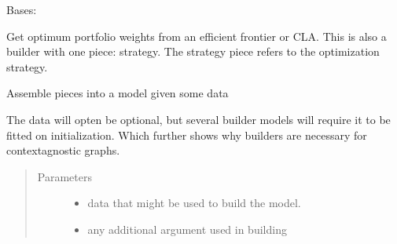 \documentclass[letterpaper,10pt,english]{sphinxmanual}
\begin{document}

\begin{fulllineitems}
\label{\detokenize{dalio.pipe:dalio.pipe.OptimumWeights}}
Bases: {\hyperref[\detokenize{dalio.pipe:dalio.pipe.pipe.PipeBuilder}]{}}

Get optimum portfolio weights from an efficient frontier or CLA.
This is also a builder with one piece: strategy. The strategy piece
refers to the optimization strategy.

\begin{fulllineitems}
\label{\detokenize{dalio.pipe:dalio.pipe.OptimumWeights.build_model}}
Assemble pieces into a model given some data

The data will opten be optional, but several builder models will
require it to be fitted on initialization. Which further shows why
builders are necessary for context\sphinxhyphen{}agnostic graphs.
\begin{quote}\begin{description}
\item[{Parameters}] \leavevmode\begin{itemize}
\item {} 
 \textendash{} data that might be used to build the model.

\item {} 
 \textendash{} any additional argument used in building

\end{itemize}

\end{description}\end{quote}

\end{fulllineitems}



\end{fulllineitems}
\end{document}
